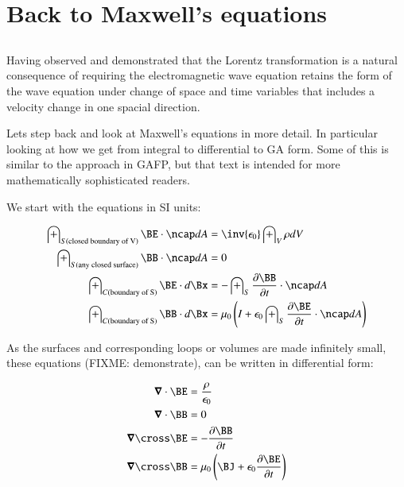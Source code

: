 \chapter{Back to Maxwell's equations}\label{chap:PJMaxwell2}


\section{}

Having observed and demonstrated that the Lorentz transformation is a natural consequence of requiring the electromagnetic wave equation retains the
form of the wave equation under change of space and time variables that includes a velocity change in one spacial direction.

Lets step back and look at Maxwell's equations in more detail.  In particular looking at how we get from integral to differential
to GA form.  Some of this is similar to the approach in GAFP, but that text is intended for more mathematically sophisticated readers.

We start with the equations in SI units:

\begin{align*}
\int_{S(\text{closed boundary of V})} \BE \cdot \ncap dA &= \inv{\epsilon_0} \int_V \rho dV \\
\int_{S(\text{any closed surface})} \BB \cdot \ncap dA &= 0 \\
\int_{C(\text{boundary of S})} \BE \cdot d\Bx &= - \int_{S} \frac{\partial \BB}{\partial t} \cdot \ncap dA \\
\int_{C(\text{boundary of S})} \BB \cdot d\Bx &= \mu_0\left(I + \epsilon_0\int_{S} \frac{\partial \BE}{\partial t} \cdot \ncap dA\right) \\
\end{align*}

As the surfaces and corresponding loops or volumes are made infinitely small, these equations (FIXME: demonstrate), can be written in differential form:

\begin{align*}
\spacegrad \cdot \BE &= \frac{\rho}{\epsilon_0} \\
\spacegrad \cdot \BB &= 0 \\
\spacegrad \cross \BE &= - \frac{\partial \BB}{\partial t} \\
\spacegrad \cross \BB &= \mu_0\left(\BJ + \epsilon_0 \frac{\partial \BE}{\partial t}\right) \\
\end{align*}

